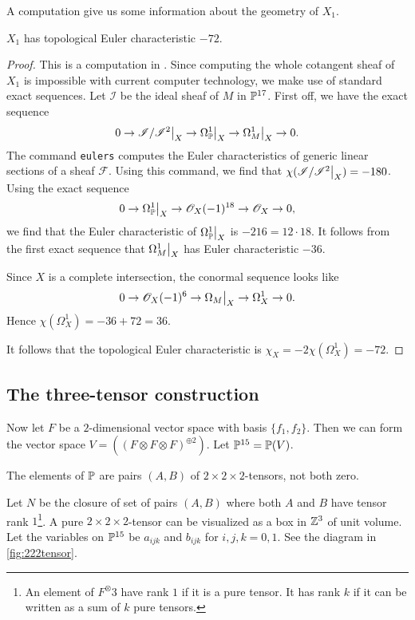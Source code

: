 A \MM computation give us some information about the geometry of $X_1$.
\begin{proposition}
\label{prop:x1euler} 
$X_1$ has topological Euler characteristic $-72$.
\end{proposition}
\begin{proof}
This is a computation in \MM. Since computing the whole cotangent sheaf of $X_1$ is impossible with current computer technology, we make use of standard exact sequences. Let $\mathscr I$ be the ideal sheaf of $M$ in $\P^{17}$. First off, we have the exact sequence
$$
0 \to \restr{\mathscr I/\mathscr I^2}{X} \to \restr{\Omega_\P^1}{X} \to \restr{\Omega_M^1}{X} \to 0.
$$
The \MM command \texttt{eulers} computes the Euler characteristics of generic linear sections of a sheaf $\mathscr F$. Using this command, we find that $\chi(\restr{\mathscr I/\mathscr I^2}{X})=-180$. Using the exact sequence
$$
0 \to \restr{\Omega_\P^1}{X} \to \OO_X(-1)^{18} \to \OO_X \to 0,
$$
we find that the Euler characteristic of $\restr{\Omega_\P^1}{X}$ is $-216=12\cdot 18$. It follows from the first exact sequence that $\restr{\Omega_M^1}{X}$ has Euler characteristic $-36$.

Since $X$ is a complete intersection, the conormal sequence looks like
$$
0 \to \OO_X(-1)^6 \to \restr{\Omega_M}{X}  \to \Omega_X^1 \to 0.
$$
Hence $\chi(\Omega_X^1) = -36+72 = 36$.

It follows that the topological Euler characteristic is $\chi_X = -2\chi(\Omega_X^1)=-72$.
\end{proof}


\subsection{The three-tensor construction}

Now let $F$ be a $2$-dimensional vector space with basis $\{f_1,f_2\}$. Then we can form the vector space $V = ((F \otimes F \otimes F)^{\oplus 2})$. Let $\P^{15}=\P(V)$.

The elements of $\P$ are pairs $(A,B)$ of $2 \times 2 \times 2$-tensors, not both zero. 

Let $N$ be the closure of set of pairs $(A,B)$ where both $A$ and $B$ have tensor rank $1$\footnote{An element of $F^\otimes 3$ have rank $1$ if it is a pure tensor. It has rank $k$ if it can be written as a sum of $k$ pure tensors.}. A pure $2 \times 2 \times 2$-tensor can be visualized as a box in $\Z^3$ of unit volume. Let the variables on $\P^{15}$ be $a_{ijk}$ and $b_{ijk}$ for $i,j,k=0,1$. See the diagram in \vref{fig:222tensor}.


